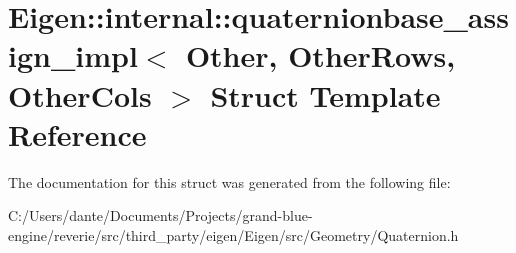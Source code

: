 \hypertarget{struct_eigen_1_1internal_1_1quaternionbase__assign__impl}{}\section{Eigen\+::internal\+::quaternionbase\+\_\+assign\+\_\+impl$<$ Other, Other\+Rows, Other\+Cols $>$ Struct Template Reference}
\label{struct_eigen_1_1internal_1_1quaternionbase__assign__impl}


The documentation for this struct was generated from the following file\+:\begin{DoxyCompactItemize}
\item 
C\+:/\+Users/dante/\+Documents/\+Projects/grand-\/blue-\/engine/reverie/src/third\+\_\+party/eigen/\+Eigen/src/\+Geometry/Quaternion.\+h\end{DoxyCompactItemize}
